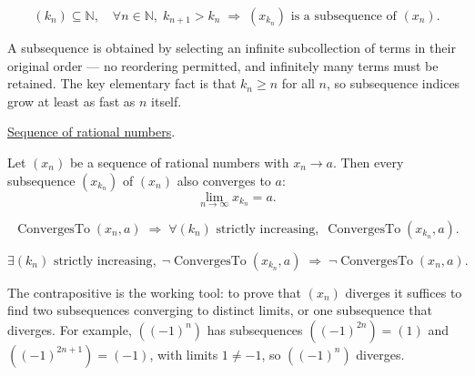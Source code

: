 \begin{remark*}
\[
(k_n) \subseteq \mathbb{N},\quad
\forall n \in \mathbb{N},\; k_{n+1} > k_n
\;\Longrightarrow\;
(x_{k_n}) \text{ is a subsequence of } (x_n).
\]
\end{remark*}

\begin{remark*}[Interpretation]
A subsequence is obtained by selecting an infinite subcollection of terms
in their original order — no reordering permitted, and infinitely many terms
must be retained.  The key elementary fact is that $k_n \geq n$ for all $n$,
so subsequence indices grow at least as fast as $n$ itself.
\end{remark*}

\begin{remark*}[Dependencies]
\hyperref[def:rational-sequence]{Sequence of rational numbers}.
\end{remark*}

\begin{theorem}
\label{thm:subsequence-convergence-q}
Let $(x_n)$ be a sequence of rational numbers with $x_n \to a$.
Then every subsequence $(x_{k_n})$ of $(x_n)$ also converges to $a$:
\[
\lim_{n \to \infty} x_{k_n} = a.
\]
\end{theorem}

\begin{remark*}
\[
\operatorname{ConvergesTo}(x_n, a)
\;\Longrightarrow\;
\forall (k_n) \text{ strictly increasing},\;
\operatorname{ConvergesTo}(x_{k_n}, a).
\]
\end{remark*}

\begin{remark*}
\[
\exists (k_n) \text{ strictly increasing},\;
\neg\operatorname{ConvergesTo}(x_{k_n}, a)
\;\Longrightarrow\;
\neg\operatorname{ConvergesTo}(x_n, a).
\]
\end{remark*}

\begin{remark*}[Interpretation]
The contrapositive is the working tool: to prove that $(x_n)$ diverges it
suffices to find two subsequences converging to distinct limits, or one
subsequence that diverges.  For example, $((-1)^n)$ has subsequences
$((-1)^{2n}) = (1)$ and $((-1)^{2n+1}) = (-1)$, with limits $1 \neq -1$,
so $((-1)^n)$ diverges.
\end{remark*}

